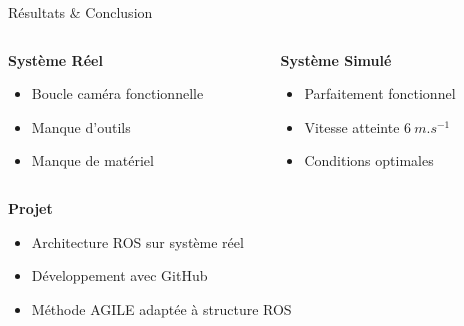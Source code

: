 \documentclass[french]{beamer}
\begin{document}
    \begin{frame}{Résultats \& Conclusion}
        \vspace{0.8cm}
        \begin{columns}[c]
            \begin{column}{0.50\textwidth}
                \centering
                \textbf{Système Réel}
                \begin{itemize}
                    \item Boucle caméra fonctionnelle
                    \item Manque d'outils
                    \item Manque de matériel
                \end{itemize}
            \end{column}
            \vrule{}
            \begin{column}{0.50\textwidth}
                \centering
                \textbf{Système Simulé}
                \begin{itemize}
                    \item Parfaitement fonctionnel
                    \item Vitesse atteinte $6~m.s^{-1}$
                    \item Conditions optimales
                \end{itemize}
            \end{column}
        \end{columns}
        \vspace{0.5cm}

        \textbf{Projet}
        \vspace{-0.3cm}
        \begin{itemize}
            \item Architecture ROS sur système réel
            \item Développement avec GitHub
            \item Méthode AGILE adaptée à structure ROS
        \end{itemize}

    \end{frame}

    \maketitle
\end{document}
